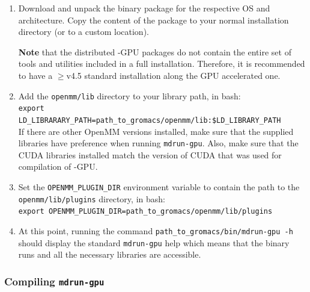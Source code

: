 \begin{enumerate}

    \item Download and unpack the binary package for the respective OS and architecture. 
    Copy the content of the package to your normal {\gromacs} installation directory (or to a custom location).
    
    {\bf Note} that the distributed {\gromacs}-GPU packages do not contain the entire set of 
    tools and utilities included in a full {\gromacs} installation. Therefore, it is recommended to  
    have a $\geq$v4.5 standard {\gromacs} installation along the GPU accelerated one.

    \item Add the {\tt openmm/lib} directory to your library path,  {\eg} in bash:\\
    {\small{\tt export LD_LIBRARARY_PATH=path_to_gromacs/openmm/lib:\$LD_LIBRARY_PATH}}\\
    If there are other OpenMM versions installed, make sure that the supplied libraries have preference  
    when running {\tt mdrun-gpu}. Also, make sure that the CUDA libraries installed match the version 
    of CUDA that was used for compilation of {\gromacs}-GPU.

    \item Set the {\tt OPENMM_PLUGIN_DIR} environment variable to contain the path to the \\ 
    {\tt openmm/lib/plugins} directory, {\eg} in bash:\\ 
    {\small{\tt export OPENMM_PLUGIN_DIR=path_to_gromacs/openmm/lib/plugins}}

    \item At this point, running the command
    {\tt path_to_gromacs/bin/mdrun-gpu -h} should display the standard {\tt mdrun-gpu} help  
    which means that the binary runs and all the necessary libraries are accessible. 

\end{enumerate}

\subsubsection{Compiling {\tt mdrun-gpu}}

